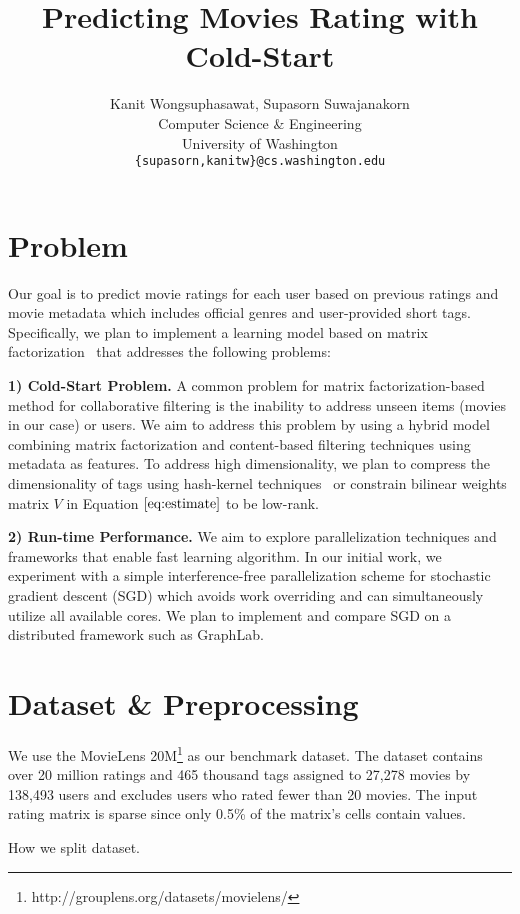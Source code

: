 \documentclass{article} %
\title{Predicting Movies Rating with Cold-Start}
\author{
	Kanit Wongsuphasawat, Supasorn Suwajanakorn \\
	Computer Science \& Engineering\\
	University of Washington\\
	\texttt{\{supasorn,kanitw\}@cs.washington.edu} \\
}
\begin{document}
	
	\maketitle  

\section{Problem}
Our goal is to predict movie ratings for each user based on previous ratings and movie metadata which includes official genres and user-provided short tags.  Specifically, we plan to implement a learning model based on matrix factorization~\cite{koren:matrix} that addresses the following problems:

\textbf{1) Cold-Start Problem.} A common problem for matrix factorization-based method for collaborative filtering is the inability to address unseen items (movies in our case) or users.  We aim to address this problem by using a hybrid model combining matrix factorization and content-based filtering techniques using metadata as features. To address high dimensionality, we plan to compress the dimensionality of tags using hash-kernel techniques~\cite{shi:hashkernels} or constrain bilinear weights matrix $V$ in Equation $\ref{eq:estimate}$ to be low-rank.

\textbf{2) Run-time Performance.} We aim to explore parallelization techniques and frameworks that enable fast learning algorithm.  In our initial work, we experiment with a simple interference-free parallelization scheme for stochastic gradient descent (SGD) which avoids work overriding and can simultaneously utilize all available cores. We plan to implement and compare SGD on a distributed framework such as GraphLab.


\section{Dataset \& Preprocessing}
We use the MovieLens 20M\footnote{http://grouplens.org/datasets/movielens/}
as our benchmark dataset.  The dataset contains over 20 million ratings and 465 thousand tags assigned to 27,278 movies by 138,493 users and excludes users who rated fewer than 20 movies. The input rating matrix is sparse since only 0.5\% of the matrix's cells contain values.

How we split dataset.
\end{document}
